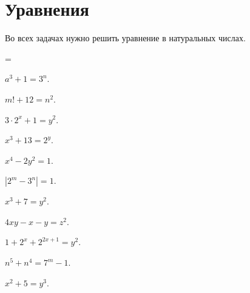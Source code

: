 

\section*{Уравнения}


Во всех задачах нужно решить уравнение в натуральных числах.

\begingroup \multicolsep=\parskip
\begin{multicols}{2}
\begin{problems}

\item
$a^3 + 1 = 3^n$.

\item
$m! + 12 = n^2$.

\item
$3 \cdot 2^x + 1 = y^2$.

\item
$x^3 + 13 = 2^y$.

\item
$x^4 - 2 y^2 = 1$.

\item
$|2^m - 3^n| = 1$.

\item
$x^3 + 7 = y^2$.

\item
$4 x y - x - y = z^2$.

\item
$1 + 2^x + 2^{2x+1} = y^2$.

\item
$n^5 + n^4 = 7^m - 1$.

\item
$x^2 + 5 = y^3$.

\par\strut %

\end{problems}
\end{multicols}
\endgroup

